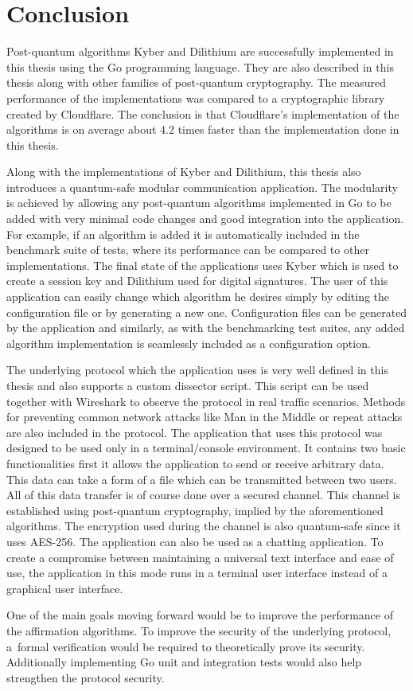 \chapter*{Conclusion}
{}

Post-quantum algorithms Kyber and Dilithium are successfully implemented in this thesis using the Go programming language. They are also described in this thesis along with other families of post-quantum cryptography. The measured performance of the implementations was compared to a cryptographic library created by Cloudflare. The conclusion is that Cloudflare's implementation of the algorithms is on average about 4.2 times faster than the implementation done in this thesis.

Along with the implementations of Kyber and Dilithium, this thesis also introduces a quantum-safe modular communication application. The modularity is achieved by allowing any post-quantum algorithms implemented in Go to be added with very minimal code changes and good integration into the application. For example, if an algorithm is added it is automatically included in the benchmark suite of tests, where its performance can be compared to other implementations. The final state of the applications uses Kyber which is used to create a session key and Dilithium used for digital signatures. The user of this application can easily change which algorithm he desires simply by editing the configuration file or by generating a new one. Configuration files can be generated by the application and similarly, as with the benchmarking test suites, any added algorithm implementation is seamlessly included as a configuration option.

The underlying protocol which the application uses is very well defined in this thesis and also supports a custom dissector script. This script can be used together with Wireshark to observe the protocol in real traffic scenarios. Methods for preventing common network attacks like Man in the Middle or repeat attacks are also included in the protocol. The application that uses this protocol was designed to be used only in a terminal/console environment. It contains two basic functionalities first it allows the application to send or receive arbitrary data. This data can take a form of a file which can be transmitted between two users. All of this data transfer is of course done over a secured channel. This channel is established using post-quantum cryptography, implied by the aforementioned algorithms. The encryption used during the channel is also quantum-safe since it uses AES-256. The application can also be used as a chatting application. To create a compromise between maintaining a universal text interface and ease of use, the application in this mode runs in a terminal user interface instead of a graphical user interface.

One of the main goals moving forward would be to improve the performance of the affirmation algorithms. To improve the security of the underlying protocol, a~formal verification would be required to theoretically prove its security. Additionally implementing Go unit and integration tests would also help strengthen the protocol security.
